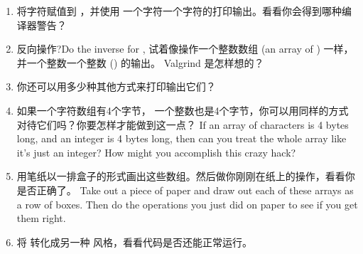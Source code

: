 \begin{enumerate}
\item 将字符赋值到  ，并使用  一个字符一个字符的打印输出。看看你会得到哪种编译器警告？
\item 反向操作?Do the inverse for , 试着像操作一个整数数组 (an array
    of ) 一样， 并一个整数一个整数 () 的输出。 Valgrind 是怎样想的？
\item 你还可以用多少种其他方式来打印输出它们？
\item 如果一个字符数组有4个字节， 一个整数也是4个字节，你可以用同样的方式对待它们吗？你要怎样才能做到这一点？
	If an array of characters is 4 bytes long, and an integer is 4 bytes
    long, then can you treat the whole  array like it's just
    an integer?  How might you accomplish this crazy hack?
\item 用笔纸以一排盒子的形式画出这些数组。然后做你刚刚在纸上的操作，看看你是否正确了。
	Take out a piece of paper and draw out each of these arrays as a
    row of boxes. Then do the operations you just did on paper to see
    if you get them right.
\item 将  转化成另一种  风格，看看代码是否还能正常运行。
\end{enumerate}


